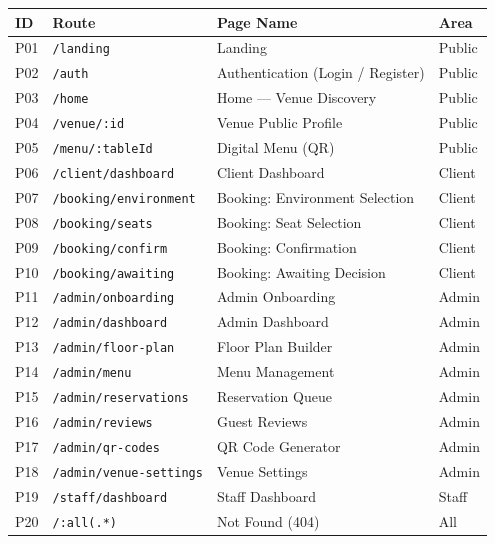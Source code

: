 \documentclass[12pt,a4paper]{article}
\begin{document}
\vspace{6pt}
\noindent
\begin{minipage}[t]{0.60\linewidth}
{\footnotesize
\begin{tabular}{@{}l l l l@{}}
    \toprule
    \textbf{ID} & \textbf{Route} & \textbf{Page Name} & \textbf{Area} \\
    \midrule
    P01 & \texttt{/landing}               & Landing                           & Public \\
    P02 & \texttt{/auth}                  & Authentication (Login / Register) & Public \\
    P03 & \texttt{/home}                  & Home --- Venue Discovery          & Public \\
    P04 & \texttt{/venue/:id}             & Venue Public Profile              & Public \\
    P05 & \texttt{/menu/:tableId}         & Digital Menu (QR)                 & Public \\
    P06 & \texttt{/client/dashboard}      & Client Dashboard                  & Client \\
    P07 & \texttt{/booking/environment}   & Booking: Environment Selection    & Client \\
    P08 & \texttt{/booking/seats}         & Booking: Seat Selection           & Client \\
    P09 & \texttt{/booking/confirm}       & Booking: Confirmation             & Client \\
    P10 & \texttt{/booking/awaiting}      & Booking: Awaiting Decision        & Client \\
    P11 & \texttt{/admin/onboarding}      & Admin Onboarding                  & Admin \\
    P12 & \texttt{/admin/dashboard}       & Admin Dashboard                   & Admin \\
    P13 & \texttt{/admin/floor-plan}      & Floor Plan Builder                & Admin \\
    P14 & \texttt{/admin/menu}            & Menu Management                   & Admin \\
    P15 & \texttt{/admin/reservations}    & Reservation Queue                 & Admin \\
    P16 & \texttt{/admin/reviews}         & Guest Reviews                     & Admin \\
    P17 & \texttt{/admin/qr-codes}        & QR Code Generator                 & Admin \\
    P18 & \texttt{/admin/venue-settings}  & Venue Settings                    & Admin \\
    P19 & \texttt{/staff/dashboard}       & Staff Dashboard                   & Staff \\
    P20 & \texttt{/:all(.*)}              & Not Found (404)                   & All \\
    \bottomrule
\end{tabular}
}
\end{minipage}%
\end{document}
